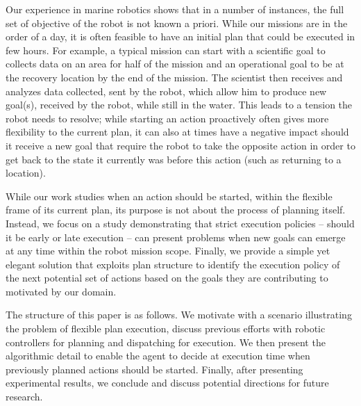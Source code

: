 Our experience in marine robotics shows that in a number of instances,
the full set of objective of the robot is not known a priori. While
our missions are in the order of a day, it is often feasible to have
an initial plan that could be executed in few hours. For example, a
typical mission can start with a scientific goal to collects data on
an area for half of the mission and an operational goal to be at the
recovery location by the end of the mission. The scientist then
receives and analyzes data collected, sent by the robot, which allow
him to produce new goal(s), received by the robot, while still in the
water. This leads to a tension the robot needs to resolve;
 while starting an action proactively often gives more flexibility 
to the current plan, it can also at times have a negative impact 
should it receive a new goal that require the robot to take the 
opposite action in order to get back to the state it currently was 
before this action (such as returning to a location). 

While our work studies when an action should be started, within the
flexible frame of its current plan, its purpose is not about the
process of planning itself. Instead, we focus on a study demonstrating
that strict execution policies -- should it be early or late execution
-- can present problems when new goals can emerge at any time within
the robot mission scope. Finally, we provide a simple yet elegant
solution that exploits plan structure to identify the execution policy
of the next potential set of actions based on the goals they are
contributing to motivated by our domain.



The structure of this paper is as follows. We motivate with a
scenario illustrating the problem of flexible plan execution, discuss
previous efforts with robotic controllers for planning and dispatching
for execution. We then present the algorithmic detail to enable the
agent to decide at execution time when previously planned actions 
should be started. Finally, after presenting experimental results, 
we conclude and discuss potential directions for future research.

